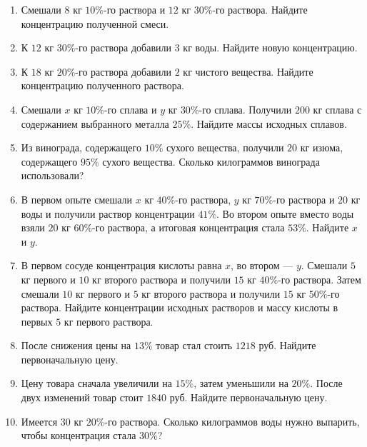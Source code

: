 \documentclass[a4paper,12pt]{article}
\begin{document}
\begin{enumerate}
\item Смешали $8$ кг $10\%$-го раствора и $12$ кг $30\%$-го раствора. Найдите концентрацию полученной смеси.

\item К $12$ кг $30\%$-го раствора добавили $3$ кг воды. Найдите новую концентрацию.

\item К $18$ кг $20\%$-го раствора добавили $2$ кг чистого вещества. Найдите концентрацию полученного раствора.

\item Смешали $x$ кг $10\%$-го сплава и $y$ кг $30\%$-го сплава. Получили $200$ кг сплава с содержанием выбранного металла $25\%$. Найдите массы исходных сплавов.

\item Из винограда, содержащего $10\%$ сухого вещества, получили $20$ кг изюма, содержащего $95\%$ сухого вещества. Сколько килограммов винограда использовали?

\item В первом опыте смешали $x$ кг $40\%$-го раствора, $y$ кг $70\%$-го раствора и $20$ кг воды и получили раствор концентрации $41\%$. Во втором опыте вместо воды взяли $20$ кг $60\%$-го раствора, а итоговая концентрация стала $53\%$. Найдите $x$ и $y$.

\item В первом сосуде концентрация кислоты равна $x$, во втором --- $y$. Смешали $5$ кг первого и $10$ кг второго раствора и получили $15$ кг $40\%$-го раствора. Затем смешали $10$ кг первого и $5$ кг второго раствора и получили $15$ кг $50\%$-го раствора. Найдите концентрации исходных растворов и массу кислоты в первых $5$ кг первого раствора.

\item После снижения цены на $13\%$ товар стал стоить $1218$ руб. Найдите первоначальную цену.

\item Цену товара сначала увеличили на $15\%$, затем уменьшили на $20\%$. После двух изменений товар стоит $1840$ руб. Найдите первоначальную цену.

\item Имеется $30$ кг $20\%$-го раствора. Сколько килограммов воды нужно выпарить, чтобы концентрация стала $30\%$?
\end{enumerate}
\end{document}
